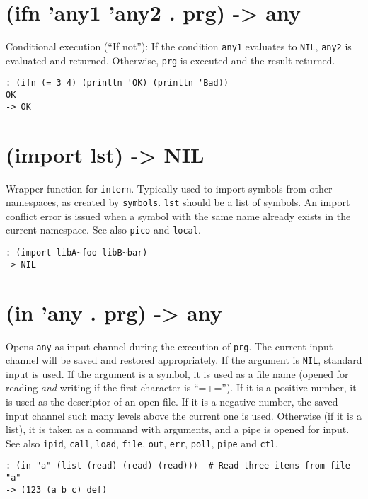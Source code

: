 {{{{{{ 
\section{(ifn 'any1 'any2 . prg) -> any}
\label{sec-8-1-9-7}


Conditional execution (``If not''): If the condition \texttt{any1} evaluates to
\texttt{NIL}, \texttt{any2} is evaluated and returned. Otherwise, \texttt{prg} is executed
and the result returned.


\begin{verbatim}
: (ifn (= 3 4) (println 'OK) (println 'Bad))
OK
-> OK
\end{verbatim}

 
\section{(import lst) -> NIL}
\label{sec-8-1-9-8}


Wrapper function for \texttt{intern}. Typically used to import symbols from
other namespaces, as created by \texttt{symbols}. \texttt{lst} should be a list of
symbols. An import conflict error is issued when a symbol with the same
name already exists in the current namespace. See also \texttt{pico} and
\texttt{local}.


\begin{verbatim}
: (import libA~foo libB~bar)
-> NIL
\end{verbatim}

 
\section{(in 'any . prg) -> any}
\label{sec-8-1-9-9}


Opens \texttt{any} as input channel during the execution of \texttt{prg}. The current
input channel will be saved and restored appropriately. If the argument
is \texttt{NIL}, standard input is used. If the argument is a symbol, it is
used as a file name (opened for reading \emph{and} writing if the first
character is ``=+=''). If it is a positive number, it is used as the
descriptor of an open file. If it is a negative number, the saved input
channel such many levels above the current one is used. Otherwise (if it
is a list), it is taken as a command with arguments, and a pipe is
opened for input. See also \texttt{ipid}, \texttt{call}, \texttt{load}, \texttt{file}, \texttt{out}, \texttt{err},
\texttt{poll}, \texttt{pipe} and \texttt{ctl}.


\begin{verbatim}
: (in "a" (list (read) (read) (read)))  # Read three items from file "a"
-> (123 (a b c) def)
\end{verbatim}

}}}}}}
